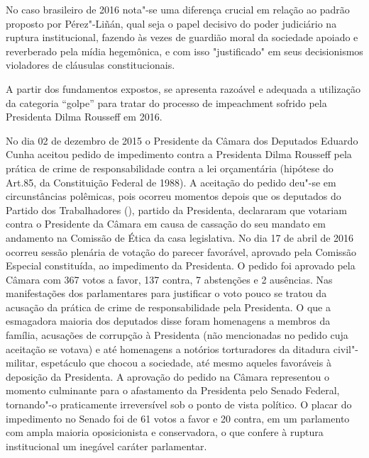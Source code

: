 No caso brasileiro de 2016 nota"-se uma diferença crucial em relação ao
padrão proposto por Pérez"-Liñán, qual seja o papel decisivo do poder
judiciário na ruptura institucional, fazendo às vezes de guardião moral
da sociedade apoiado e reverberado pela mídia hegemônica, e com isso
"justificado" em seus decisionismos violadores de cláusulas
constitucionais.

A partir dos fundamentos expostos, se apresenta razoável e adequada a
utilização da categoria ``golpe'' para tratar do processo de impeachment
sofrido pela Presidenta Dilma Rousseff em 2016.

No dia 02 de dezembro de 2015 o Presidente da Câmara dos Deputados
Eduardo Cunha aceitou pedido de impedimento contra a Presidenta Dilma
Rousseff pela prática de crime de responsabilidade contra a lei
orçamentária (hipótese do Art.85,  da Constituição Federal de 1988). A
aceitação do pedido deu"-se em circunstâncias polêmicas, pois ocorreu
momentos depois que os deputados do Partido dos Trabalhadores (),
partido da Presidenta, declararam que votariam contra o Presidente da
Câmara em causa de cassação do seu mandato em andamento na Comissão de
Ética da casa legislativa. No dia 17 de abril de 2016 ocorreu sessão
plenária de votação do parecer favorável, aprovado pela Comissão
Especial constituída, ao impedimento da Presidenta. O pedido foi
aprovado pela Câmara com 367 votos a favor, 137 contra, 7 abstenções e 2
ausências. Nas manifestações dos parlamentares para justificar o voto
pouco se tratou da acusação da prática de crime de responsabilidade pela
Presidenta. O que a esmagadora maioria dos deputados disse foram
homenagens a membros da família, acusações de corrupção à Presidenta
(não mencionadas no pedido cuja aceitação se votava) e até homenagens a
notórios torturadores da ditadura civil"-militar, espetáculo que chocou a
sociedade, até mesmo aqueles favoráveis à deposição da Presidenta. A
aprovação do pedido na Câmara representou o momento culminante para o
afastamento da Presidenta pelo Senado Federal, tornando"-o praticamente
irreversível sob o ponto de vista político. O placar do impedimento no
Senado foi de 61 votos a favor e 20 contra, em um parlamento com ampla
maioria oposicionista e conservadora, o que confere à ruptura
institucional um inegável caráter parlamentar.


